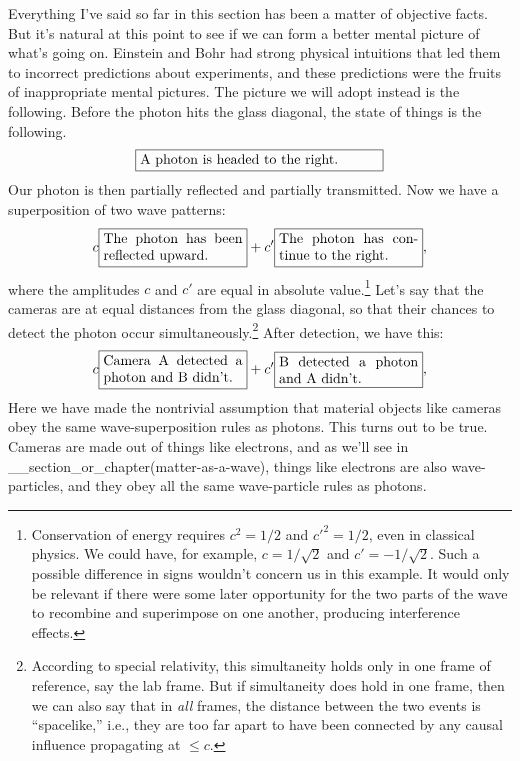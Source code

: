 Everything I've said so far in this section has been a matter of objective
facts. But it's natural at this point to see if we can form a better
mental picture of what's going on. Einstein and Bohr had strong physical
intuitions that led them to incorrect predictions about experiments, and
these predictions were the fruits of inappropriate mental pictures. The
picture we will adopt instead is the following. Before the photon hits the glass
diagonal, the state of things is the following.
\begin{equation*}
\fbox{\parbox{60mm}{A photon is headed to the right.}}
\end{equation*}
Our photon is then partially reflected and partially transmitted. Now we have
a superposition of two wave patterns:
\begin{equation*}
 c\fbox{\parbox{35mm}{The photon has been reflected upward.}}
+c'\fbox{\parbox{35mm}{The photon has continue to the right.}},
\end{equation*}
where the amplitudes $c$ and $c'$ are equal in absolute value.\footnote{
Conservation of energy requires $c^2=1/2$ and $c'^2=1/2$,
even in classical physics. We could have, for
example, $c=1/\sqrt{2}$ and $c'=-1/\sqrt{2}$. Such a possible difference in
signs wouldn't concern us in this example. It would only be relevant if there
were some later opportunity for the two parts of the wave to recombine and
superimpose on one another, producing interference effects.}
Let's say that the cameras are at equal distances from the glass diagonal,
so that their chances to detect the photon occur simultaneously.\footnote{
According to special relativity, this simultaneity holds only in one frame
of reference, say the lab frame. But if simultaneity does hold in one frame,
then we can also say that in \emph{all} frames, the distance between the two
events is ``spacelike,'' i.e., they are too far apart to have been connected
by any causal influence propagating at $\le c$.
}
After detection, we have this:
\begin{equation*}
 c\fbox{\parbox{35mm}{Camera A detected a photon and B didn't.}}
+c'\fbox{\parbox{35mm}{B detected a photon and A didn't.}},
\end{equation*}
Here we have made the nontrivial assumption that material objects like
cameras obey the same wave-superposition rules as photons. This turns out
to be true. Cameras are made out of things like electrons,
and as we'll see in __section_or_chapter(matter-as-a-wave), things like
electrons are also wave-particles, and they obey all the same wave-particle rules
as photons.

